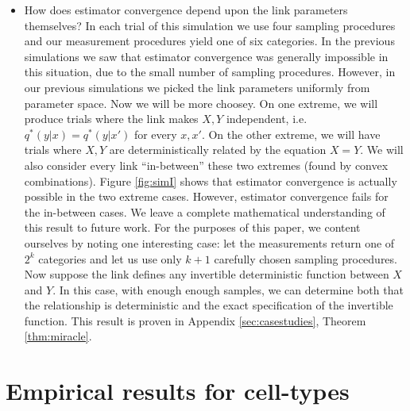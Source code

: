 \begin{itemize}
    \item How does estimator convergence depend upon the link parameters themselves?  In each trial of this simulation we use four sampling procedures and our measurement procedures yield one of six categories.  In the previous simulations we saw that estimator convergence was generally impossible in this situation, due to the small number of sampling procedures.  However, in our previous simulations we picked the link parameters uniformly from parameter space.  Now we will be more choosey.   On one extreme, we will produce trials where the link makes $X,Y$ independent, i.e. $q^*(y|x)=q^*(y|x')$ for every $x,x'$.  On the other extreme, we will have trials where $X,Y$ are deterministically related by the equation $X=Y$.  We will also consider every link ``in-between'' these two extremes (found by convex combinations).  Figure \ref{fig:simI} shows that estimator convergence is actually possible in the two extreme cases.  However, estimator convergence fails for the in-between cases.  We leave a complete mathematical understanding of this result to future work.  For the purposes of this paper, we content ourselves by noting one interesting case: let the measurements return one of $2^k$ categories and let us use only $k+1$ carefully chosen sampling procedures.  Now suppose the link defines any invertible deterministic function between $X$ and $Y$.  In this case, with enough enough samples, we can determine both that the relationship is deterministic and the exact specification of the invertible function.  This result is proven in Appendix \ref{sec:casestudies}, Theorem \ref{thm:miracle}.
\end{itemize}

                                       

\section{Empirical results for cell-types}

